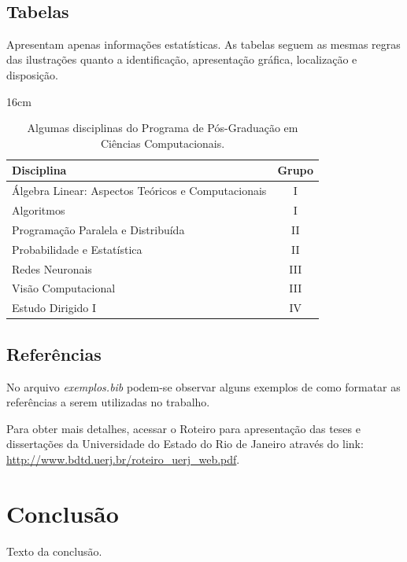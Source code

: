 \vfill~\\


\section{Tabelas}

Apresentam apenas informações estatísticas. As tabelas seguem as mesmas regras das ilustrações quanto a identificação, apresentação gráfica, localização e disposição.

\begin{table}[htb]{16cm}
    \caption{\protect Algumas disciplinas do Programa de Pós-Graduação em Ciências Computacionais.}
    \label{tab:casos_sarampo}
    \hfill\begin{tabular}{l|c}
        Disciplina & Grupo \\
        \hline 
         Álgebra Linear: Aspectos Teóricos e Computacionais & I\\
         Algoritmos & I\\
         Programação Paralela e Distribuída & II\\
         Probabilidade e Estatística & II\\
         Redes Neuronais & III\\
         Visão Computacional & III\\
         Estudo Dirigido I & IV
    \end{tabular}\hfill
\end{table}


\section{Referências}

No arquivo \textit{exemplos.bib} podem-se observar alguns exemplos de como formatar as referências a serem utilizadas no trabalho. 

Para obter mais detalhes, acessar o Roteiro para apresentação das teses e dissertações da Universidade do Estado do Rio de Janeiro através do link: \url{http://www.bdtd.uerj.br/roteiro_uerj_web.pdf}.

\chapter*{Conclusão} %

Texto da conclusão.
